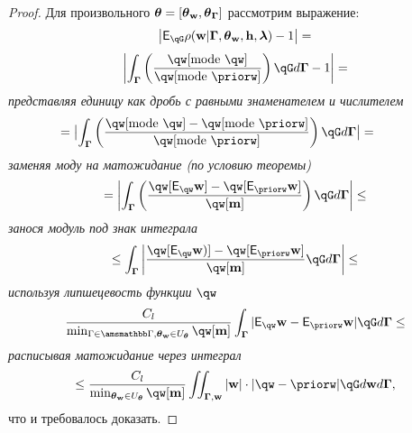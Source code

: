 \begin{proof}
Для произвольного $\boldsymbol{\theta}=[\boldsymbol{\theta}_\mathbf{w}, \boldsymbol{\theta}_{\boldsymbol{\Gamma}}]$ рассмотрим выражение:
\[
   \left|\E_{\qG} {\rho}(\w|\G, \tetaw, \h, \lam) - 1\right| =
\]
\[
   \left|\int_{\G} \left(\frac{\qw[\text{mode}~\qw]}{\qw[\text{mode}~\priorw]} \right)\qG d\G  - 1 \right| =
\]
\textit{представляя единицу как дробь с равными знаменателем и числителем}
\begin{multline*}
\hspace{-1cm}
 =  \bigl|\int_{\G} \left(\frac{\qw[\text{mode}~\qw] - \qw[\text{mode}~\priorw]}{\qw[\text{mode}~\priorw]}\right) \qG d\G \bigr| =
\end{multline*}
\textit{заменяя моду на матожидание (по условию теоремы)}
\[  = \left|\int_{\G} \left( \frac{\qw[\E_{\qw}\w] - \qw[\E_{\priorw} \w]}{\qw[\mathbf{m}]}\right)  \qG d\G\right| \leq 
\]
\textit{занося модуль под знак интеграла}
\[
\leq 
\int_{\G} \left|\frac{\qw[\E_{\qw} \w)] - \qw[\E_{\priorw} \w]}{{\qw[\mathbf{m}]}} \qG d\G\right| \leq
\]
\textit{используя липшецевость функции }$\qw$
\[
\frac{C_l}{\min_{\Gamma \in \Gb, \tetaw \in \Uteta} \qw[\mathbf{m}]}\int_{\G}  |\E_{\qw}\w - \E_{\priorw}\w|\qG d\G  \leq
\]
\textit{расписывая матожидание через интеграл}
\[
    \leq \frac{C_l}{\min_{\tetaw \in \Uteta} \qw[\mathbf{m}]} \iint_{\G,\w} |\w| \cdot |\qw - \priorw|\qG d\w d\G,
\] 
что и требовалось доказать.
\end{proof}



